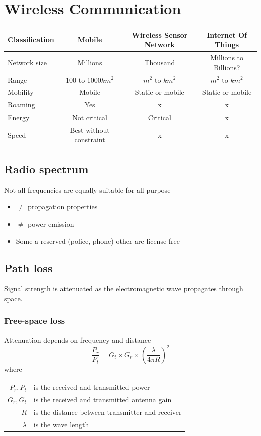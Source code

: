 
\section{Wireless Communication}

\begin{tabular}{|l|ccc|}
    \hline
    Classification & Mobile & Wireless Sensor Network & Internet Of Things\\
    \hline
    Network size & Millions & Thousand & Millions to Billions? \\
    Range & 100 to 1000$km^2$ & $m^2$ to $km^2$ & $m^2$ to $km^2$\\
    Mobility & Mobile & Static or mobile & Static or mobile \\
    Roaming & Yes & x & x \\
    Energy & Not critical & Critical & x \\
    Speed & Best without constraint & x & x \\
    \hline
\end{tabular}


\subsection{Radio spectrum}
Not all frequencies are equally suitable for all purpose
\begin{itemize}
    \item $\neq$ propagation properties
    \item $\neq$ power emission
    \item Some a reserved (police, phone) other are license free
\end{itemize}

\subsection{Path loss}

Signal strength is attenuated as the electromagnetic wave propagates
through space.

\subsubsection{Free-space loss}
Attenuation depends on frequency and distance
$$\frac{P_r}{P_t} = G_t \times G_r \times ( \frac{\lambda}{4\pi R})^2$$
where \begin{tabular}{rl}
    $P_r,P_t$ & is the received and transmitted power\\
    $G_r,G_t$ & is the received and transmitted antenna gain\\
    $R$ & is the distance between transmitter and receiver\\
    $\lambda$ & is the wave length\\
\end{tabular}

